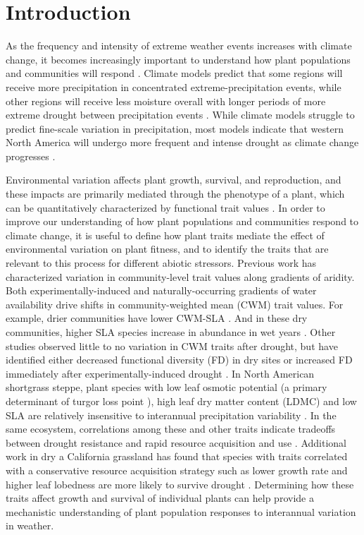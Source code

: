 \documentclass[12pt, letterpaper]{article}
\begin{document}
\section{Introduction}
As the frequency and intensity of extreme weather events increases with climate change, it becomes increasingly important to understand how plant populations and communities will respond . Climate models predict that some regions will receive more precipitation in concentrated extreme-precipitation events, while other regions will receive less moisture overall with longer periods of more extreme drought between precipitation events \cite{Knapp2008ConsequencesEcosystems}. While climate models struggle to predict fine-scale variation in precipitation, most models indicate that western North America will undergo more frequent and intense drought as climate change progresses \cite{Hartmann2013}.

Environmental variation affects plant growth, survival, and reproduction, and these impacts are primarily mediated through the phenotype of a plant, which can be quantitatively characterized by functional trait values . In order to improve our understanding of how plant populations and communities respond to climate change, it is useful to define how plant traits mediate the effect of environmental variation on plant fitness, and to identify the traits that are relevant to this process for different abiotic stressors. Previous work has characterized variation in community-level trait values along gradients of aridity. Both experimentally-induced and naturally-occurring gradients of water availability drive shifts in community-weighted mean (CWM) trait values. For example, drier communities have lower CWM-SLA \cite{Nunes2017WhichDrylands, Cornwell2009CommunityCalifornia}. And in these dry communities, higher SLA species increase in abundance in wet years \cite{Wilcox2020PlantPrairie}. Other studies observed little to no variation in CWM traits after drought, but have identified either decreased functional diversity (FD) in dry sites \cite{Luo2019LongGrasslands} or increased FD immediately after experimentally-induced drought \cite{Griffin-Nolan2019}. In North American shortgrass steppe, plant species with low leaf osmotic potential (a primary determinant of turgor loss point \cite{Bartlett2012a}), high leaf dry matter content (LDMC) and low SLA are relatively insensitive to interannual precipitation variability \cite{Wilcox2020PlantPrairie}. In the same ecosystem, correlations among these and other traits indicate tradeoffs between drought resistance and rapid resource acquisition and use \cite{Blumenthal2020}. Additional work in dry a California grassland has found that species with traits correlated with a conservative resource acquisition strategy such as lower growth rate and higher leaf lobedness are more likely to survive drought \cite{Luong2021}. Determining how these traits affect growth and survival of individual plants can help provide a mechanistic understanding of plant population responses to interannual variation in weather.
\end{document}
